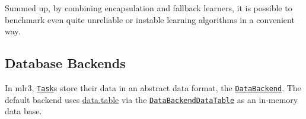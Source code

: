 \documentclass[]{article}
\newenvironment{Shaded}{}{}
\newcommand{\CommentTok}[1]{\textcolor[rgb]{0.00,0.50,0.00}{#1}}
\newcommand{\DataTypeTok}[1]{#1}
\newcommand{\FloatTok}[1]{#1}
\newcommand{\KeywordTok}[1]{\textcolor[rgb]{0.00,0.00,1.00}{#1}}
\newcommand{\NormalTok}[1]{#1}
\newcommand{\OperatorTok}[1]{#1}
\newcommand{\StringTok}[1]{\textcolor[rgb]{0.00,0.50,0.50}{#1}}
\renewenvironment{Shaded} {\begin{snugshade}\small} {\end{snugshade}}
\begin{document}
\begin{Shaded}
\end{Shaded}

Summed up, by combining encapsulation and fallback learners, it is possible to benchmark even quite unreliable or instable learning algorithms in a convenient way.

\hypertarget{backends}{%
\subsection{Database Backends}\label{backends}}

In mlr3, \href{https://mlr3.mlr-org.com/reference/Task.html}{\texttt{Task}}s store their data in an abstract data format, the \href{https://mlr3.mlr-org.com/reference/DataBackend.html}{\texttt{DataBackend}}.
The default backend uses \href{https://cran.r-project.org/package=data.table}{data.table} via the \href{https://mlr3.mlr-org.com/reference/DataBackendDataTable.html}{\texttt{DataBackendDataTable}} as an in-memory data base.
\end{document}
